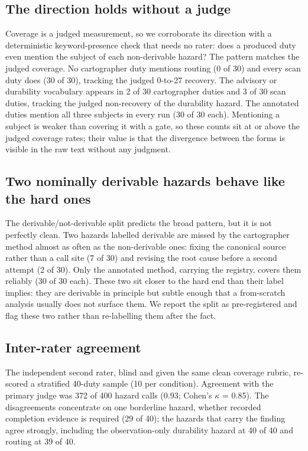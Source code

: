 \documentclass[11pt,a4paper]{article}
\begin{document}
\subsection{The direction holds without a judge}

Coverage is a judged measurement, so we corroborate its direction with a
deterministic keyword-presence check that needs no rater: does a produced duty
even mention the subject of each non-derivable hazard? The pattern matches the
judged coverage. No cartographer duty mentions routing (0 of 30) and every scan
duty does (30 of 30), tracking the judged 0-to-27 recovery. The advisory or
durability vocabulary appears in 2 of 30 cartographer duties and 3 of 30 scan
duties, tracking the judged non-recovery of the durability hazard. The annotated
duties mention all three subjects in every run (30 of 30 each). Mentioning a
subject is weaker than covering it with a gate, so these counts sit at or above
the judged coverage rates; their value is that the divergence between the forms
is visible in the raw text without any judgment.

\subsection{Two nominally derivable hazards behave like the hard ones}\label{sec:hardfp}

The derivable/not-derivable split predicts the broad pattern, but it is not
perfectly clean. Two hazards labelled derivable are missed by the cartographer
method almost as often as the non-derivable ones: fixing the canonical source
rather than a call site (7 of 30) and revising the root cause before a second
attempt (2 of 30). Only the annotated method, carrying the registry, covers them
reliably (30 of 30 each). These two sit closer to the hard end than their label
implies: they are derivable in principle but subtle enough that a from-scratch
analysis usually does not surface them. We report the split as pre-registered
and flag these two rather than re-labelling them after the fact.

\subsection{Inter-rater agreement}

The independent second rater, blind and given the same clean coverage rubric,
re-scored a stratified 40-duty sample (10 per condition). Agreement
with the primary judge was 372 of 400 hazard calls (0.93; Cohen's $\kappa$ =
0.85). The disagreements concentrate on one borderline hazard, whether recorded
completion evidence is required (29 of 40); the hazards that carry the finding
agree strongly, including the observation-only durability hazard at 40 of 40 and
routing at 39 of 40.
\end{document}
